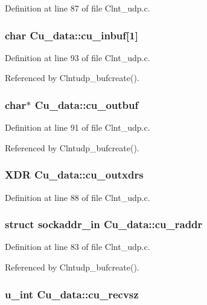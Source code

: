 Definition at line 87 of file Clnt\_\-udp.c.
\subsubsection{\setlength{\rightskip}{0pt plus 5cm}char {\bf Cu\_\-data::cu\_\-inbuf}[1]}\label{structCu__data_o12}




Definition at line 93 of file Clnt\_\-udp.c.

Referenced by Clntudp\_\-bufcreate().
\subsubsection{\setlength{\rightskip}{0pt plus 5cm}char$\ast$ {\bf Cu\_\-data::cu\_\-outbuf}}\label{structCu__data_o10}




Definition at line 91 of file Clnt\_\-udp.c.

Referenced by Clntudp\_\-bufcreate().
\subsubsection{\setlength{\rightskip}{0pt plus 5cm}XDR {\bf Cu\_\-data::cu\_\-outxdrs}}\label{structCu__data_o7}




Definition at line 88 of file Clnt\_\-udp.c.
\subsubsection{\setlength{\rightskip}{0pt plus 5cm}struct sockaddr\_\-in {\bf Cu\_\-data::cu\_\-raddr}}\label{structCu__data_o2}




Definition at line 83 of file Clnt\_\-udp.c.

Referenced by Clntudp\_\-bufcreate().
\subsubsection{\setlength{\rightskip}{0pt plus 5cm}u\_\-int {\bf Cu\_\-data::cu\_\-recvsz}}\label{structCu__data_o11}




